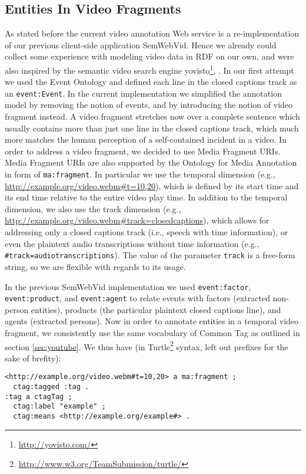 \documentclass{acm_proc_article-sp}
\begin{document}
\subsection{Entities In Video Fragments}
As stated before the current video annotation Web service is a re-implementation of our previous client-side application SemWebVid\cite{Steiner:SemWebVid}. Hence we already could collect some experience with modeling video data in RDF on our own, and were also inspired by the semantic video search engine yovisto\footnote{\url{http://yovisto.com/}}\cite{Sack:Use}, \cite{Sack:VideoSearch}. In our first attempt we used the Event Ontology\cite{Raimond:Event} and defined each line in the closed captions track as an \texttt{event:Event}. In the current implementation we simplified the annotation model by removing the notion of events, and by introducing the notion of video fragment instead. A video fragment stretches now over a complete sentence which usually contains more than just one line in the closed captions track, which much more matches the human perception of a self-contained incident in a video. In order to address a video fragment, we decided to use Media Fragment URIs\cite{W3C:MediaFrags}. Media Fragment URIs are also supported by the Ontology for Media Annotation in form of \texttt{ma:fragment}. In particular we use the temporal dimension (e.g., \url{http://example.org/video.webm#t=10,20}), which is defined by its start time and its end time relative to the entire video play time. In addition to the temporal dimension, we also use the track dimension (e.g., \url{http://example.org/video.webm#track=closedcaptions}), which allows for addressing only a closed captions track (i.e., speech with time information), or even the plaintext audio transcriptions without time information (e.g., \texttt{\#track=audiotranscriptions}). The value of the parameter \texttt{track} is a free-form string, so we are flexible with regards to its usage.

In the previous SemWebVid implementation we used \texttt{event:factor}, \texttt{event:product}, and \texttt{event:agent} to relate events with factors (extracted non-person entities), products (the particular plaintext closed captions line), and agents (extracted persons). Now in order to annotate entities in a temporal video fragment, we consistently use the same vocabulary of Common Tag as outlined in section \ref{sec:youtube}. We thus have (in Turtle\footnote{\url{http://www.w3.org/TeamSubmission/turtle/}} syntax, left out prefixes for the sake of brefity):
\begin{verbatim}
<http://example.org/video.webm#t=10,20> a ma:fragment ;
  ctag:tagged :tag .
:tag a ctagTag ;
  ctag:label "example" ;
  ctag:means <http://example.org/example#> .
\end{verbatim}
\end{document}
